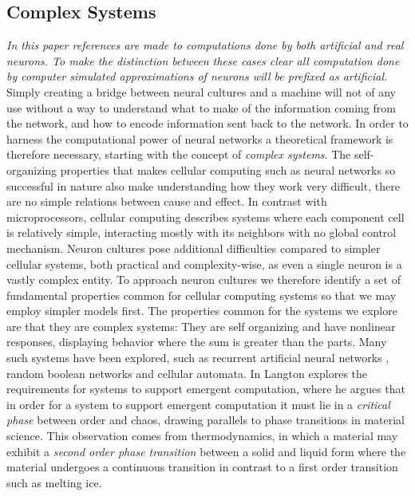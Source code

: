\subsection{Complex Systems}
\textit{
  In this paper references are made to computations done by both artificial and real
  neurons.
  To make the distinction between these cases clear all computation done by
  computer simulated approximations of neurons will be prefixed as artificial.
}\\
Simply creating a bridge between neural cultures and a machine will not of any
use without a way to understand what to make of the information coming from the
network, and how to encode information sent back to the network.
In order to harness the computational power of neural networks a theoretical
framework is therefore necessary, starting with the concept of \textit{complex
  systems}.
The self-organizing properties that makes cellular computing such as
neural networks so successful in nature also make understanding how they work
very difficult, there are no simple relations between cause and effect.
In contrast with microprocessors, cellular computing describes systems where
each component cell is relatively simple, interacting mostly with its neighbors
with no global control mechanism.
Neuron cultures pose additional difficulties compared to simpler cellular
systems, both practical and complexity-wise, as even a single neuron is a vastly
complex entity.
To approach neuron cultures we therefore identify a set of fundamental
properties common for cellular computing systems so that we may employ simpler
models first.
The properties common for the systems we explore are that they are complex
systems: They are self organizing and have nonlinear responses, displaying
behavior where the sum is greater than the parts.
Many such systems have been explored, such as recurrent artificial neural
networks \cite{bertschinger_real-time_2004}, random boolean networks
\cite{gershenson_introduction_2004} and cellular automata.
In \cite{langton_computation_1990} Langton explores the requirements for systems
to support emergent computation, where
he argues that in order for a system to support emergent computation it must
lie in a \textit{critical phase} between order and chaos, drawing parallels to
phase transitions in material science.
This observation comes from thermodynamics, in which a material may exhibit a
\textit{second order phase transition} between a solid and liquid form where the
material undergoes a continuous transition in contrast to a first order
transition such as melting ice.
